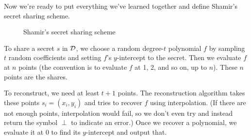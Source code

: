 Now we're ready to put everything we've learned together and define 
Shamir's secret sharing scheme\footnotemark.

\begin{figure}[h!]
\begin{pchstack}[center]
\end{pchstack}
\caption{Shamir's secret sharing scheme}
\label{fig:shamirSS}
\end{figure}

To share a secret $s$ in $\mathcal{D}$, we choose a random 
degree-$t$ polynomial $f$ by sampling $t$ random coefficients and 
setting $f$'s $y$-intercept to the secret. Then we evaluate $f$ at $n$ points 
(the convention is to evaluate $f$ at 1, 2, and so on, up 
to $n$)\footnotemark. These $n$ points are the shares.

To reconstruct, we need at least $t+1$ points. The reconstruction 
algorithm takes these points $s_i = (x_i, y_i)$ and tries to recover 
$f$ using interpolation. (If there are not enough points, interpolation 
would fail, so we don't even try and instead return the symbol $\perp$ to indicate an error.)
Once we recover a polynomial, we evaluate it at 0 to find its 
$y$-intercept and output that.

